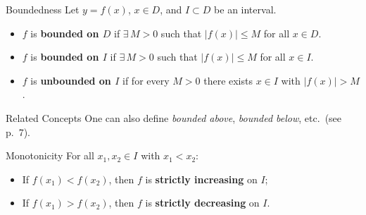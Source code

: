 \documentclass[aspectratio=169,10pt]{beamer}
\begin{document}
\begin{frame}{Boundedness}
  Let $y=f(x)$, $x\in D$, and $I\subset D$ be an interval.
  \pause
  \begin{definition}[Bounded]
    \begin{itemize}
      \item $f$ is \textbf{bounded on $D$} if $\exists\,M>0$ such that $|f(x)|\le M$ for all $x\in D$.
      \pause
      \item $f$ is \textbf{bounded on $I$} if $\exists\,M>0$ such that $|f(x)|\le M$ for all $x\in I$.
      \pause
      \item $f$ is \textbf{unbounded on $I$} if for every $M>0$ there exists $x\in I$ with $|f(x)|>M$.
    \end{itemize}
  \end{definition}
  \pause
  \begin{block}{Related Concepts}
    One can also define \emph{bounded above}, \emph{bounded below}, etc.\ (see p.~7).
  \end{block}
\end{frame}

\begin{frame}{Monotonicity}
  For all $x_1,x_2\in I$ with $x_1<x_2$:
  \pause
  \begin{definition}[Monotone]
    \begin{itemize}
      \item If $f(x_1)<f(x_2)$, then $f$ is \textbf{strictly increasing} on $I$;
      \pause
      \item If $f(x_1)>f(x_2)$, then $f$ is \textbf{strictly decreasing} on $I$.
    \end{itemize}
  \end{definition}
  \pause
  \vspace{4pt}
  \begin{center}
  \end{center}
\end{frame}
\end{document}
